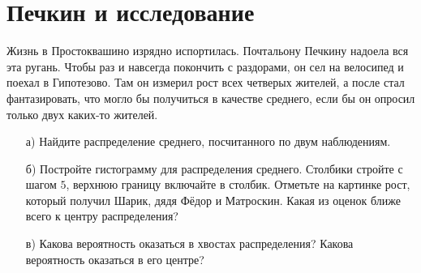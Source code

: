 \documentclass[12pt, a4paper, oneside]{article}
\begin{document}
\section{Печкин и исследование}

Жизнь в Простоквашино изрядно испортилась. Почтальону Печкину надоела вся эта ругань. Чтобы раз и навсегда покончить с раздорами, он сел на велосипед и поехал в Гипотезово. Там он измерил рост всех четверых жителей, а после стал фантазировать, что могло бы получиться в качестве среднего, если бы он опросил только двух каких-то жителей. 

\begin{enumerate} 
	\item[а)] Найдите распределение среднего, посчитанного по двум наблюдениям. 
	\item[б)]  Постройте гистограмму для распределения среднего. Столбики стройте с шагом $5$, верхнюю границу включайте в столбик. Отметьте на картинке рост, который получил Шарик, дядя Фёдор и Матроскин. Какая из оценок ближе всего к центру распределения? 
	\item[в)] Какова вероятность оказаться в хвостах распределения? Какова вероятность оказаться в его центре? 
\end{enumerate} 
\end{document}
